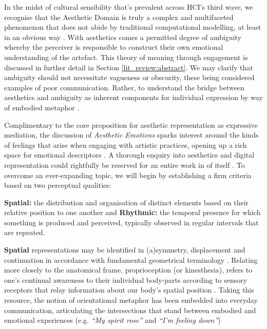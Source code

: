 In the midst of cultural sensibility that's prevalent across HCI's third wave, we recognise that the Aesthetic Domain is truly a complex and multifaceted phenomenon that does not abide by traditional computational modelling, at least in an obvious way \cite{bardzell_interaction_2009, rentschler_innate_1999}. With aesthetics comes a permitted degree of ambiguity whereby the perceiver is responsible to construct their own emotional understanding of the artefact. This theory of meaning through engagement is discussed in further detail in Section \ref{lit_review:abstract}. We may clarify that ambiguity should not necessitate vagueness or obscurity, these being considered examples of poor communication. Rather, to understand the bridge between aesthetics and ambiguity as inherent components for individual expression by way of embodied metaphor \cite{dauden_roquet_body_2020,lakoff_metaphors_2003}. 

Complimentary to the core proposition for aesthetic representation as expressive mediation, the discussion of \textit{Aesthetic Emotions} sparks interest around the kinds of feelings that arise when engaging with artistic practices, opening up a rich space for emotional descriptors \cite{schindler_measuring_2017,fingerhut_aesthetic_2020}. A thorough enquiry into aesthetics and digital representation could rightfully be reserved for an entire work in of itself \cite{carvalhais_art_2022}
. To overcome an ever-expanding topic, we will begin by establishing a firm criteria based on two perceptual qualities:

\textbf{Spatial:} the distribution and organisation of distinct elements based on their relative position to one another and \textbf{Rhythmic:} the temporal presence for which something is produced and perceived, typically observed in regular intervals that are repeated.

\textbf{Spatial} representations may be identified in (a)symmetry, displacement and continuation in accordance with fundamental geometrical terminology \cite{mcmanus_symmetry_2005,boselie_general_1984}. Relating more closely to the anatomical frame, proprioception (or kinesthesia), refers to one's continual awareness to their individual body-parts according to sensory receptors that relay information about our body's spatial position \cite{lamkin-kennard_sensors_2019}. Taking this resource, the notion of orientational metaphor has been embedded into everyday communication, articulating the intersections that stand between embodied and emotional experiences \citep{gow_spatial_2001,zlatev_phenomenology_2010} (e.g. \textit{“My spirit rose”} and \textit{“I’m feeling down”})

